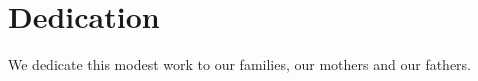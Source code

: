 \chapter*{Dedication}




We dedicate this modest work to our families, our mothers and our fathers.
